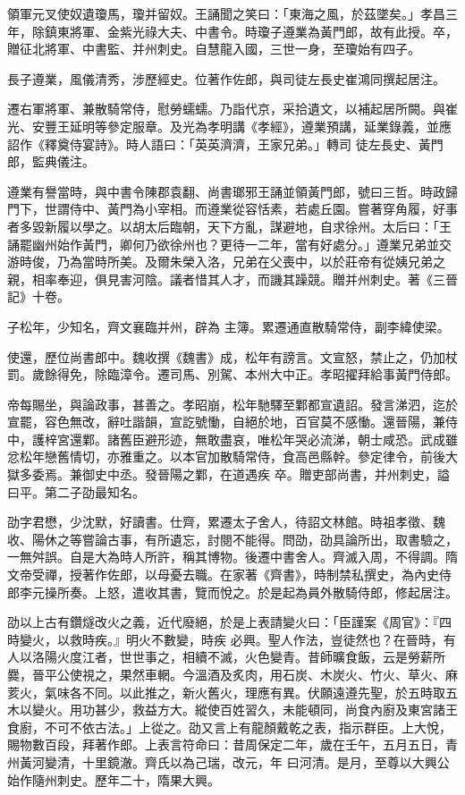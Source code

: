 \begin{pinyinscope}
 領軍元叉使奴遺瓊馬，瓊并留奴。王誦聞之笑曰：「東海之風，於茲墜矣。」孝昌三年，除鎮東將軍、金紫光祿大夫、中書令。時瓊子遵業為黃門郎，故有此授。卒，贈征北將軍、中書監、并州刺史。自慧龍入國，三世一身，至瓊始有四子。



 長子遵業，風儀清秀，涉歷經史。位著作佐郎，與司徒左長史崔鴻同撰起居注。



 遷右軍將軍、兼散騎常侍，慰勞蠕蠕。乃詣代京，采拾遺文，以補起居所闕。與崔光、安豐王延明等參定服章。及光為孝明講《孝經》，遵業預講，延業錄義，並應詔作《釋奠侍宴詩》。時人語曰：「英英濟濟，王家兄弟。」轉司
 徒左長史、黃門郎，監典儀注。



 遵業有譽當時，與中書令陳郡袁翻、尚書瑯邪王誦並領黃門郎，號曰三哲。時政歸門下，世謂侍中、黃門為小宰相。而遵業從容恬素，若處丘園。嘗著穿角履，好事者多毀新履以學之。以胡太后臨朝，天下方亂，謀避地，自求徐州。太后曰：「王誦罷幽州始作黃門，卿何乃欲徐州也？更待一二年，當有好處分。」遵業兄弟並交游時俊，乃為當時所美。及爾朱榮入洛，兄弟在父喪中，以於莊帝有從姨兄弟之親，相率奉迎，俱見害河陰。議者惜其人才，而譏其躁競。贈并州刺史。著《三晉記》十卷。



 子松年，少知名，齊文襄臨并州，辟為
 主簿。累遷通直散騎常侍，副李緯使梁。



 使還，歷位尚書郎中。魏收撰《魏書》成，松年有謗言。文宣怒，禁止之，仍加杖罰。歲餘得免，除臨漳令。遷司馬、別駕、本州大中正。孝昭擢拜給事黃門侍郎。



 帝每賜坐，與論政事，甚善之。孝昭崩，松年馳驛至鄴都宣遺詔。發言涕泗，迄於宣罷，容色無改，辭吐諧韻，宣訖號慟，自絕於地，百官莫不感慟。還晉陽，兼侍中，護梓宮還鄴。諸舊臣避形迹，無敢盡哀，唯松年哭必流涕，朝士咸恐。武成雖忿松年戀舊情切，亦雅重之。以本官加散騎常侍，食高邑縣幹。參定律令，前後大獄多委焉。兼御史中丞。發晉陽之鄴，在道遇疾
 卒。贈吏部尚書，并州刺史，謚曰平。第二子劭最知名。



 劭字君懋，少沈默，好讀書。仕齊，累遷太子舍人，待詔文林館。時祖孝徵、魏收、陽休之等嘗論古事，有所遺忘，討閱不能得。問劭，劭具論所出，取書驗之，一無舛誤。自是大為時人所許，稱其博物。後遷中書舍人。齊滅入周，不得調。隋文帝受禪，授著作佐郎，以母憂去職。在家著《齊書》，時制禁私撰史，為內史侍郎李元操所奏。上怒，遣收其書，覽而悅之。於是起為員外散騎侍郎，修起居注。



 劭以上古有鑽燧改火之義，近代廢絕，於是上表請變火曰：「臣謹案《周官》：『四時變火，以救時疾。』明火不數變，時疾
 必興。聖人作法，豈徒然也？在晉時，有人以洛陽火度江者，世世事之，相續不滅，火色變青。昔師曠食飯，云是勞薪所爨，晉平公使視之，果然車輞。今溫酒及炙肉，用石炭、木炭火、竹火、草火、麻荄火，氣味各不同。以此推之，新火舊火，理應有異。伏願遠遵先聖，於五時取五木以變火。用功甚少，救益方大。縱使百姓習久，未能頓同，尚食內廚及東宮諸王食廚，不可不依古法。」上從之。劭又言上有龍顏戴乾之表，指示群臣。上大悅，賜物數百段，拜著作郎。上表言符命曰：昔周保定二年，歲在壬午，五月五日，青州黃河變清，十里鏡澈。齊氏以為己瑞，改元，年
 曰河清。是月，至尊以大興公始作隨州刺史。歷年二十，隋果大興。




\end{pinyinscope}

